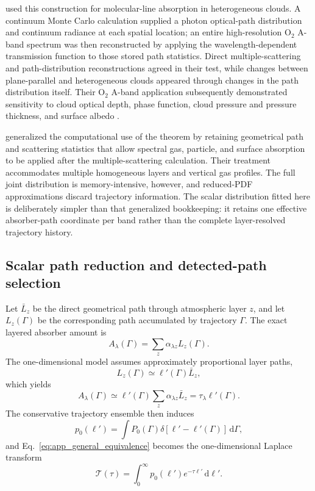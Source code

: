 \citet{stephens2000} used this construction for molecular-line absorption in
heterogeneous clouds.  A continuum Monte Carlo calculation supplied a photon
optical-path distribution and continuum radiance at each spatial location; an
entire high-resolution O$_2$ A-band spectrum was then reconstructed by applying
the wavelength-dependent transmission function to those stored path
statistics.  Direct multiple-scattering and path-distribution reconstructions
agreed in their test, while changes between plane-parallel and heterogeneous
clouds appeared through changes in the path distribution itself.  Their O$_2$
A-band application subsequently demonstrated sensitivity to cloud optical
depth, phase function, cloud pressure and pressure thickness, and surface
albedo \citep{heidinger2000}.

\citet{partain2000} generalized the computational use of the theorem by
retaining geometrical path and scattering statistics that allow spectral gas,
particle, and surface absorption to be applied after the multiple-scattering
calculation.  Their treatment accommodates multiple homogeneous layers and
vertical gas profiles.  The full joint distribution is memory-intensive,
however, and reduced-PDF approximations discard trajectory information.  The
scalar distribution fitted here is deliberately simpler than that generalized
bookkeeping: it retains one effective absorber-path coordinate per band rather
than the complete layer-resolved trajectory history.

\subsection{Scalar path reduction and detected-path selection}
\label{app:scalar_path}

Let $\bar L_z$ be the direct geometrical path through atmospheric layer $z$, and
let $L_z(\Gamma)$ be the corresponding path accumulated by trajectory
$\Gamma$.  The exact layered absorber amount is
\begin{equation}
  A_\lambda(\Gamma)
  = \sum_z \alpha_{\lambda z}L_z(\Gamma).
  \label{eq:app_layer_absorption}
\end{equation}
The one-dimensional model assumes approximately proportional layer paths,
\begin{equation}
  L_z(\Gamma)\simeq\ell'(\Gamma)\bar L_z,
  \label{eq:app_collinear_paths}
\end{equation}
which yields
\begin{equation}
  A_\lambda(\Gamma)
  \simeq \ell'(\Gamma)
          \sum_z\alpha_{\lambda z}\bar L_z
  = \tau_\lambda\ell'(\Gamma).
  \label{eq:app_scalar_absorption}
\end{equation}
The conservative trajectory ensemble then induces
\begin{equation}
  p_0(\ell')
  = \int P_0(\Gamma)
    \delta[\ell'-\ell'(\Gamma)]\,\mathrm{d}\Gamma,
  \label{eq:app_pdf}
\end{equation}
and Eq.~\eqref{eq:app_general_equivalence} becomes the one-dimensional Laplace
transform
\begin{equation}
  \mathcal T(\tau)
  = \int_0^\infty p_0(\ell')e^{-\tau\ell'}\,\mathrm{d}\ell'.
  \label{eq:app_laplace}
\end{equation}

